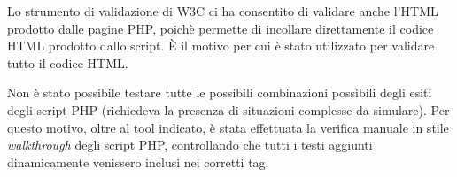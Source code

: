 Lo strumento di validazione di W3C ci ha consentito di validare anche l’HTML prodotto dalle pagine PHP, poichè permette di incollare direttamente il codice HTML prodotto dallo script. È il motivo per cui è stato utilizzato per validare tutto il codice HTML. 

Non è stato possibile testare tutte le possibili combinazioni possibili degli esiti degli script PHP (richiedeva la presenza di situazioni complesse da simulare). Per questo motivo, oltre al tool indicato, è stata effettuata la verifica manuale in stile \textit{walkthrough} degli script PHP, controllando che tutti i testi aggiunti dinamicamente venissero inclusi nei corretti tag.